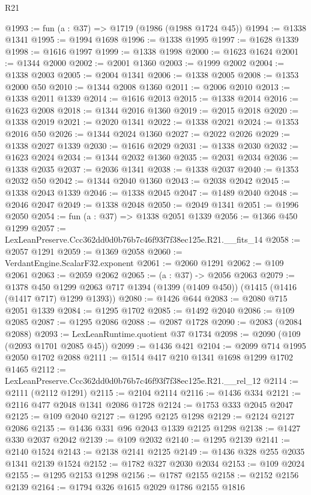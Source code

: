 \begin{lexlean}{R21}
\begin{coremodule}
@1993 := fun (a : @37) => @1719 (@1986 (@1988 @1724 @45))
@1994 := @1338 @1341
@1995 := @1994 @1698
@1996 := @1338 @1995
@1997 := @1628 @1339
@1998 := @1616 @1997
@1999 := @1338 @1998
@2000 := @1623 @1624
@2001 := @1344 @2000
@2002 := @2001 @1360
@2003 := @1999 @2002
@2004 := @1338 @2003
@2005 := @2004 @1341
@2006 := @1338 @2005
@2008 := @1353 @2000 @50
@2010 := @1344 @2008 @1360
@2011 := @2006 @2010
@2013 := @1338 @2011 @1339
@2014 := @1616 @2013
@2015 := @1338 @2014
@2016 := @1623 @2008
@2018 := @1344 @2016 @1360
@2019 := @2015 @2018
@2020 := @1338 @2019
@2021 := @2020 @1341
@2022 := @1338 @2021
@2024 := @1353 @2016 @50
@2026 := @1344 @2024 @1360
@2027 := @2022 @2026
@2029 := @1338 @2027 @1339
@2030 := @1616 @2029
@2031 := @1338 @2030
@2032 := @1623 @2024
@2034 := @1344 @2032 @1360
@2035 := @2031 @2034
@2036 := @1338 @2035
@2037 := @2036 @1341
@2038 := @1338 @2037
@2040 := @1353 @2032 @50
@2042 := @1344 @2040 @1360
@2043 := @2038 @2042
@2045 := @1338 @2043 @1339
@2046 := @1338 @2045
@2047 := @1489 @2040
@2048 := @2046 @2047
@2049 := @1338 @2048
@2050 := @2049 @1341
@2051 := @1996 @2050
@2054 := fun (a : @37) => @1338 @2051 @1339
@2056 := @1366 @450 @1299
@2057 := LexLeanPreserve.Ccc362dd0d0b76b7c46f93f7f38ec125e.R21.__fits_14
@2058 := @2057 @1291
@2059 := @1369 @2058
@2060 := VerdantEngine.ScalarF32.exponent
@2061 := @2060 @1291
@2062 := @109 @2061
@2063 := @2059 @2062
@2065 := (a : @37) -> @2056 @2063
@2079 := @1378
    @450
    @1299
    @2063
    @717
    @1394
    (@1399 (@1409 @450))
    (@1415 (@1416 (@1417 @717) @1299 @1393))
@2080 := @1426 @644
@2083 := @2080 @715 @2051 @1339
@2084 := @1295 @1702
@2085 := @1492 @2040
@2086 := @109 @2085
@2087 := @1295 @2086
@2088 := @2087 @1728
@2090 := @2083 (@2084 @2088)
@2093 := LexLeanRuntime.quotient @37 @1734
@2098 := @2090 (@109 (@2093 @1701 @2085 @45))
@2099 := @1436 @421
@2104 := @2099 @714 @1995 @2050 @1702 @2088
@2111 := @1514 @417 @210 @1341 @1698 @1299 @1702 @1465
@2112 := LexLeanPreserve.Ccc362dd0d0b76b7c46f93f7f38ec125e.R21.__rel_12
@2114 := @2111 (@2112 @1291)
@2115 := @2104 @2114
@2116 := @1436 @334
@2121 := @2116 @477 @2048 @1341 @2086 @1728
@2124 := @1753 @333 @2045 @2047
@2125 := @109 @2040
@2127 := @1295 @2125 @1298
@2129 := @2124 @2127 @2086
@2135 := @1436 @331 @96 @2043 @1339 @2125 @1298
@2138 := @1427 @330 @2037 @2042
@2139 := @109 @2032
@2140 := @1295 @2139
@2141 := @2140 @1524
@2143 := @2138 @2141 @2125
@2149 := @1436 @328 @255 @2035 @1341 @2139 @1524
@2152 := @1782 @327 @2030 @2034
@2153 := @109 @2024
@2155 := @1295 @2153 @1298
@2156 := @1787 @2155
@2158 := @2152 @2156 @2139
@2164 := @1794 @326 @1615 @2029 @1786 @2155 @1816

\end{coremodule}
\end{lexlean}
